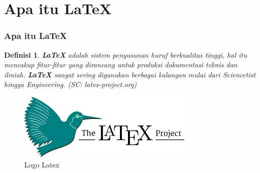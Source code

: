 \documentclass[aspectratio=169,10pt]{beamer}
\newtheorem{definisi}{Definisi}
\begin{document}
\section{Apa itu \LaTeX}
\begin{frame}
    \frametitle{Apa itu \LaTeX}
    \begin{definisi}
        \textbf{\LaTeX} adalah sistem penyusunan huruf berkualitas tinggi, hal itu mencakup 
        fitur-fitur yang dirancang untuk produksi dokumentasi teknis dan ilmiah. 
        \textbf{\LaTeX} sangat sering digunakan berbagai kalangan mulai dari \textit{Sciencetist}
        hingga \textit{Engineering}. (SC: latex-project.org)
    \end{definisi}
    \begin{figure}[h!]
        \includegraphics[width=0.3\linewidth]{LatexLogo.png}
        \caption{Logo Latex}
    \end{figure}
\end{frame}
\end{document}
